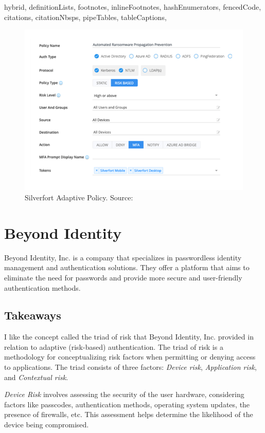 \documentclass[
  digital,     %
  oneside,     %
  nosansbold,  %
  nocolorbold, %
  lof,         %
  lot,         %
]{fithesis4}
\begin{document}
\begin{markdown*}{%
  hybrid,
  definitionLists,
  footnotes,
  inlineFootnotes,
  hashEnumerators,
  fencedCode,
  citations,
  citationNbsps,
  pipeTables,
  tableCaptions,
}
\begin{figure}[htbp]
  \centering
  \includegraphics[width=1\textwidth]{img/silverfort-auth-policy.png}
  \caption[Silverfort Adaptive Policy]{Silverfort Adaptive Policy. Source: \cite{example_silverfort}}
  \label{fig:silverfort-auth-policy}
\end{figure}

\newpage
\section{Beyond Identity}

Beyond Identity, Inc. is a company that specializes in passwordless identity management and authentication solutions. They offer a platform that aims to eliminate the need for passwords and provide more secure and user-friendly authentication methods.

\subsection{Takeaways}
I like the concept called the triad of risk that Beyond Identity, Inc. provided in relation to adaptive (risk-based) authentication.
The triad of risk is a methodology for conceptualizing risk factors when permitting or denying access to applications.
The triad consists of three factors: \textit{Device risk}, \textit{Application risk}, and \textit{Contextual risk}.

\textit{Device Risk} involves assessing the security of the user hardware, considering factors like passcodes, authentication methods, operating system updates, the presence of firewalls, etc.
This assessment helps determine the likelihood of the device being compromised.


\end{markdown*}
\end{document}
